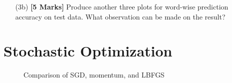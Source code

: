 \documentclass[11pt]{report}
\begin{document}
\begin{itemize}
	\item[(3b)] {\bf [5 Marks]} Produce another three plots for word-wise prediction accuracy on test data.  What observation can be made on the result?
\end{itemize}


\section{Stochastic Optimization}

\begin{figure}[t]
	\centering
	\hspace{4em}
	\caption{Comparison of SGD, momentum, and LBFGS}
	\label{fig:compare_optimizer}
\end{figure}
\end{document}
